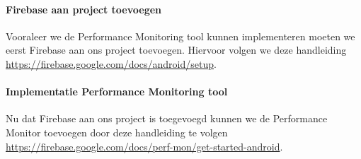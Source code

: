 \paragraph{Firebase aan project toevoegen}
Vooraleer we de Performance Monitoring tool kunnen implementeren moeten we eerst Firebase 
aan ons project toevoegen. Hiervoor volgen we deze handleiding 
\url{https://firebase.google.com/docs/android/setup}.



\paragraph{Implementatie Performance Monitoring tool}
Nu dat Firebase aan ons project is toegevoegd kunnen we de Performance Monitor 
toevoegen door deze handleiding te volgen \url{https://firebase.google.com/docs/perf-mon/get-started-android}.



